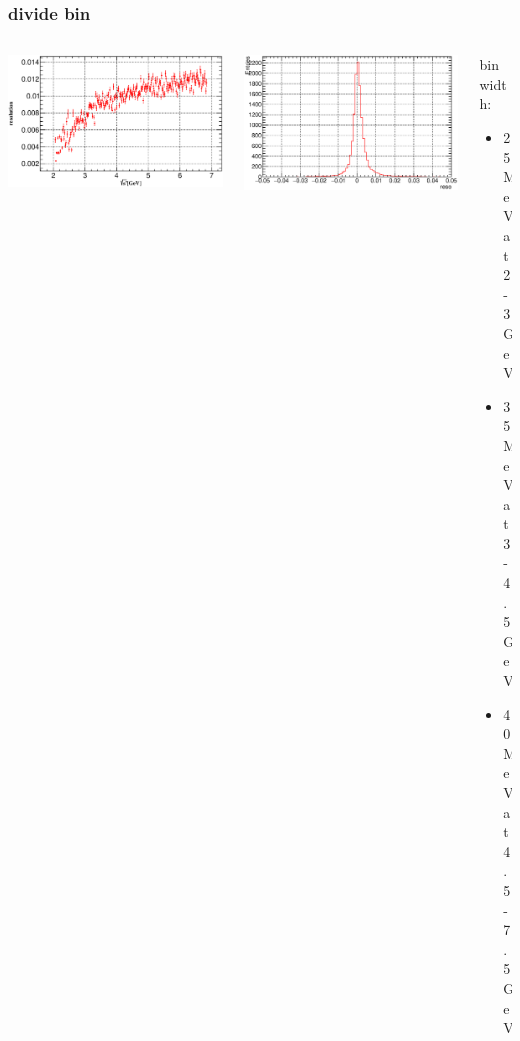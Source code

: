 \documentclass[aspectratio=169]{ctexbeamer}
\begin{document}
\begin{frame}
  \frametitle{divide bin}
   \begin{columns}
    \begin{column}{0.4\textwidth}
      \centering
      \includegraphics[width=\textwidth]{figures/divide_bin.eps}
    \end{column}

    \begin{column}{0.4\textwidth}
      \centering
      \includegraphics[width=\textwidth]{figures/reso.eps}
    \end{column}

    \begin{column}{0.33\textwidth}
      bin width:
     \begin{itemize}
      \item 25MeV at 2-3GeV
      \item 35MeV at 3-4.5GeV
      \item 40MeV at 4.5-7.5GeV
     \end{itemize}
    \end{column}
   \end{columns}
\end{frame}
\end{document}
